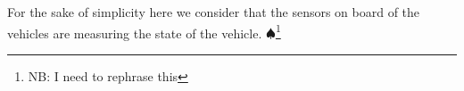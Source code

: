 \documentclass[letterpaper, 10 pt, conference]{ieeeconf}  %
\newcommand\NB[1]{$\spadesuit$\footnote{NB: #1}}
\begin{document}
For the sake of simplicity here we consider that the sensors on board of the vehicles are measuring the state of the vehicle. \NB{I need to rephrase this}

\end{document}
